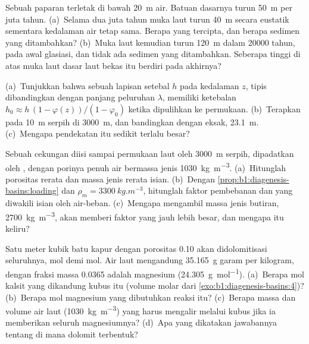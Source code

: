 \begin{exercise}[$\star\star$]\label{exo:b1:diagenesis-basins:9}
Sebuah paparan terletak di bawah \qty{20}{m} air. Batuan dasarnya turun \qty{50}{m} per juta tahun. (a)~Selama dua juta tahun muka laut turun \qty{40}{m} secara eustatik sementara kedalaman air tetap sama. Berapa  yang tercipta, dan berapa sedimen yang ditambahkan? (b)~Muka laut kemudian turun \qty{120}{m} dalam \num{20000} tahun, pada awal glasiasi, dan tidak ada sedimen yang ditambahkan. Seberapa tinggi di atas muka laut dasar laut bekas itu berdiri pada akhirnya?
\end{exercise}

\begin{exercise}[$\star\star\star$]\label{exo:b1:diagenesis-basins:10}
(a)~Tunjukkan bahwa sebuah lapisan setebal $h$ pada kedalaman $z$, tipis dibandingkan dengan
panjang peluruhan $\lambda$, memiliki ketebalan $h_0 \approx h\,(1 - \varphi(z))/(1 -
\varphi_0)$ ketika dipulihkan ke permukaan. (b)~Terapkan pada \qty{10}{m} serpih di \qty{3000}{m}, dan bandingkan dengan  eksak, \qty{23.1}{m}. (c)~Mengapa pendekatan itu sedikit terlalu besar?
\end{exercise}

\begin{exercise}[$\star\star\star$]\label{exo:b1:diagenesis-basins:11}
Sebuah cekungan diisi sampai permukaan laut oleh \qty{3000}{m} serpih, dipadatkan oleh , dengan porinya penuh air bermassa jenis \qty{1030}{kg.m^{-3}}. (a)~Hitunglah porositas rerata dan massa jenis rerata isian. (b)~Dengan
\cref{prop:b1:diagenesis-basins:loading} dan $\rho_m =
\qty{3300}{kg.m^{-3}}$, hitunglah faktor pembebanan dan  yang diwakili isian oleh air-beban. (c)~Mengapa mengambil massa jenis butiran, \qty{2700}{kg.m^{-3}}, akan memberi faktor yang jauh lebih besar, dan mengapa itu keliru?
\end{exercise}

\begin{exercise}[$\star\star\star$]\label{exo:b1:diagenesis-basins:12}
Satu meter kubik batu kapur dengan porositas \num{0.10} akan didolomitisasi seluruhnya, mol demi mol. Air laut mengandung \qty{35.165}{g} garam per kilogram, dengan fraksi massa \num{0.0365} adalah magnesium (\qty{24.305}{g.mol^{-1}}). (a)~Berapa mol kalsit yang dikandung kubus itu (volume molar dari
\cref{exo:b1:diagenesis-basins:4})? (b)~Berapa mol magnesium yang dibutuhkan reaksi itu? (c)~Berapa massa dan volume air laut (\qty{1030}{kg.m^{-3}}) yang harus mengalir melalui kubus jika ia memberikan seluruh magnesiumnya? (d)~Apa yang dikatakan jawabannya tentang di mana dolomit terbentuk?
\end{exercise}

